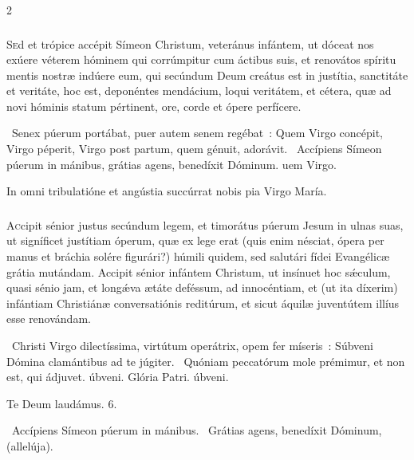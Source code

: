 \documentclass[9pt,twoside]{extarticle}
\begin{document}
\begin{multicols}{2}
\subsubsection*{\center{}}
\lettrine{S}ed et trópice accépit Símeon Christum, veteránus infántem, ut dóceat nos exúere véterem hóminem qui corrúmpitur cum áctibus suis, et renovátos spíritu mentis nostræ indúere eum, qui secúndum Deum creátus est in justítia, sanctitáte et veritáte, hoc est, deponéntes mendácium, loqui veritátem, et cétera, quæ ad novi hóminis statum pértinent, ore, corde et ópere perfícere.

\begin{tightlist}{}
\item {}~Senex púerum portábat, puer autem senem regébat~: \textred{*} Quem Virgo concépit, Virgo péperit, Virgo post partum, quem génuit, adorávit. ~Accípiens Símeon púerum in mánibus, grátias agens, benedíxit Dóminum. uem Virgo.
\item {\small {} In omni tribulatióne et angústia succúrrat nobis pia Virgo María.}
\end{tightlist}

\subsubsection*{\center{}}
\lettrine{A}ccipit sénior justus secúndum legem, et timorátus púerum Jesum in ulnas suas, ut signíficet justítiam óperum, quæ ex lege erat (quis enim nésciat, ópera per manus et bráchia solére figurári?) húmili quidem, sed salutári fídei Evangélicæ grátia mutándam. Accipit sénior infántem Christum, ut insínuet hoc sǽculum, quasi sénio jam, et longǽva ætáte deféssum, ad innocéntiam, et (ut ita díxerim) infántiam Christiánæ conversatiónis reditúrum, et sicut áquilæ juventútem illíus esse renovándam. 

\begin{tightlist}{}
\item {}~Christi Virgo dilectíssima, virtútum operátrix, opem fer míseris~: \textred{*} Súbveni Dómina clamántibus ad te júgiter. ~Quóniam peccatórum mole prémimur, et non est, qui ádjuvet. úbveni. Glória Patri. úbveni.
\item Te Deum laudámus. 6.
\item {}~Accípiens Símeon púerum in mánibus. ~Grátias agens, benedíxit Dóminum, (allelúja). 
\end{tightlist}


\end{multicols}
\end{document}
